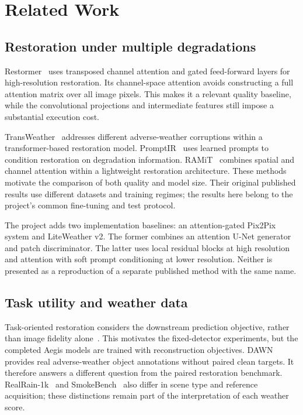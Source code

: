 \section{Related Work}
\label{sec:related}
\subsection{Restoration under multiple degradations}
Restormer~\cite{Zamir_2022_CVPR} uses transposed channel attention and gated
feed-forward layers for high-resolution restoration. Its channel-space
attention avoids constructing a full attention matrix over all image pixels.
This makes it a relevant quality baseline, while the convolutional projections
and intermediate features still impose a substantial execution cost.

TransWeather~\cite{Valanarasu_2022_CVPR} addresses different adverse-weather
corruptions within a transformer-based restoration model. PromptIR~\cite{NEURIPS2023_e187897e}
uses learned prompts to condition restoration on degradation information.
RAMiT~\cite{Choi_2024_CVPR} combines spatial and channel attention within a
lightweight restoration architecture. These methods motivate the comparison
of both quality and model size. Their original published results use different
datasets and training regimes; the results here belong to the project's
common fine-tuning and test protocol.

The project adds two implementation baselines: an attention-gated Pix2Pix
system and LiteWeather v2. The former combines an attention U-Net generator
and patch discriminator. The latter uses local residual blocks at high
resolution and attention with soft prompt conditioning at lower resolution.
Neither is presented as a reproduction of a separate published method with
the same name.

\subsection{Task utility and weather data}
Task-oriented restoration considers the downstream prediction objective,
rather than image fidelity alone~\cite{Chen_2025_CVPR,Gupta_2024_WACV}.
This motivates the fixed-detector experiments, but the completed Aegis models
are trained with reconstruction objectives. DAWN~\cite{Kenk_2020_DAWN}
provides real adverse-weather object annotations without paired clean targets.
It therefore answers a different question from the paired restoration benchmark.
RealRain-1k~\cite{Li_2022_RealRain} and SmokeBench~\cite{Jin_2025_SmokeBench}
also differ in scene type and reference acquisition; these distinctions
remain part of the interpretation of each weather score.

